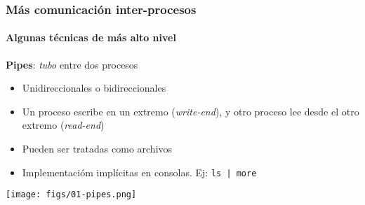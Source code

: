 \documentclass[letter]{beamer}
\begin{document}
%
%
%


%
%  
%
%
\begin{frame}
  \frametitle{Más comunicación inter-procesos}
  \framesubtitle{Algunas técnicas de más alto nivel}

  {\bf Pipes}: {\em tubo} entre dos procesos
  \begin{itemize}
    \item Unidireccionales o bidireccionales
    \item Un proceso escribe en un extremo ({\em write-end}), y otro proceso lee desde el otro extremo ({\em read-end})
    \item Pueden ser tratadas como archivos
    \item Implementacióm implícitas en consolas. Ej: {\tt ls | more}
  \end{itemize}

  \begin{center}
    \texttt{[image: figs/01-pipes.png]}
  \end{center}

\end{frame}
\end{document}
